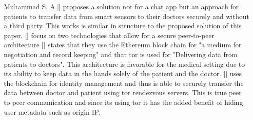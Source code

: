 \documentclass{article}
\begin{document}
Muhammad S. A.[] proposes a solution not for a chat app but an approach for patients to transfer data from smart sensors to their doctors securely and without a third party. 
This works is similar in structure to the proposed solution of this paper. 
[] focus on two technologies that allow for a secure peer-to-peer architecture 
[] states that they use the Ethereum block chain for "a medium for negotiation and record keeping" and that tor is used for "Delivering data from patients to doctors".
This architecture is favorable for the medical setting due to its ability to keep data in the hands solely  of the patient and the doctor. 
[] uses the blockchain for identity management and thus is able to securely transfer the data between doctor and patient using tor rendezvous servers.  
This is true peer to peer communication and since its using tor it has the added benefit of hiding user metadata such as origin IP. 
\end{document}
